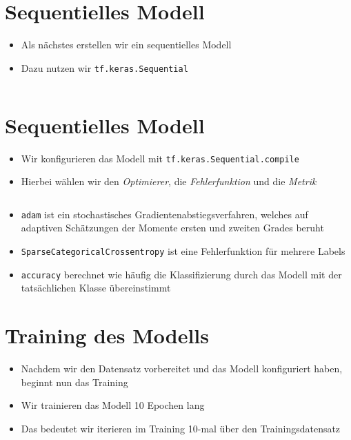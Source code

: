 \documentclass[t]{beamer}
\newcommand\pycode[1]{\inputminted[frame=lines, framesep=2mm, fontsize=\normalsize]{python}{#1}}
\begin{document}
\section{Sequentielles Modell}
\begin{frame}
    \begin{itemize}
        \item Als nächstes erstellen wir ein sequentielles Modell
        \item Dazu nutzen wir \texttt{tf.keras.Sequential}
        \pycode{./code-snippets/sequential-model-no-aug.py}
    \end{itemize}
\end{frame}

\section{Sequentielles Modell}
\begin{frame}
    \begin{itemize}
        \item Wir konfigurieren das Modell mit \texttt{tf.keras.Sequential.compile}
        \item Hierbei wählen wir den \emph{Optimierer}, die \emph{Fehlerfunktion} und die \emph{Metrik}
        \pycode{./code-snippets/model-compile.py}
        \item \texttt{adam} ist ein stochastisches Gradientenabstiegsverfahren, welches auf adaptiven Schätzungen der Momente ersten und zweiten Grades beruht
        \item \texttt{SparseCategoricalCrossentropy} ist eine Fehlerfunktion für mehrere Labels
        \item \texttt{accuracy} berechnet wie häufig die Klassifizierung durch das Modell mit der tatsächlichen Klasse übereinstimmt
    \end{itemize}
\end{frame}

\section{Training des Modells}
\begin{frame}
    \begin{itemize}
        \item Nachdem wir den Datensatz vorbereitet und das Modell konfiguriert haben, beginnt nun das Training
        \newline
        \item Wir trainieren das Modell 10 Epochen lang
        \item Das bedeutet wir iterieren im Training 10-mal über den Trainingsdatensatz
        \pycode{./code-snippets/model-fit.py}
    \end{itemize}
\end{frame}
\end{document}

